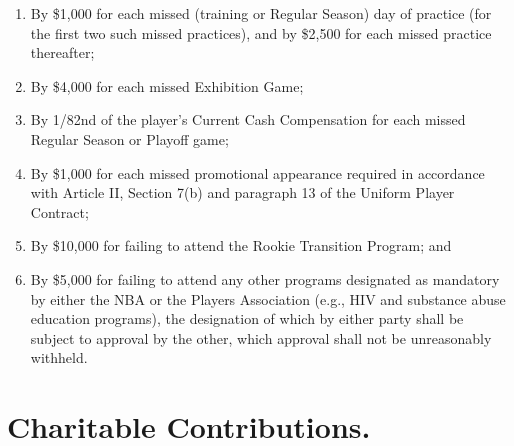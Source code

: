 \documentclass[
]{book}
\providecommand{\tightlist}{%
  \setlength{\itemsep}{0pt}\setlength{\parskip}{0pt}}
\begin{document}
\begin{enumerate}
\def\labelenumi{(\alph{enumi})}
\tightlist
\item
  By \$1,000 for each missed (training or Regular Season) day of practice (for the first two such missed practices), and by \$2,500 for each missed practice thereafter;
\item
  By \$4,000 for each missed Exhibition Game;
\item
  By 1/82nd of the player's Current Cash Compensation for each missed Regular Season or Playoff game;
\item
  By \$1,000 for each missed promotional appearance required in accordance with Article II, Section 7(b) and paragraph 13 of the Uniform Player Contract;
\item
  By \$10,000 for failing to attend the Rookie Transition Program; and
\item
  By \$5,000 for failing to attend any other programs designated as mandatory by either the NBA or the Players Association (e.g., HIV and substance abuse education programs), the designation of which by either party shall be subject to approval by the other, which approval shall not be unreasonably withheld.
\end{enumerate}

\hypertarget{charitable-contributions.}{%
\section{Charitable Contributions.}\label{charitable-contributions.}}
\end{document}
